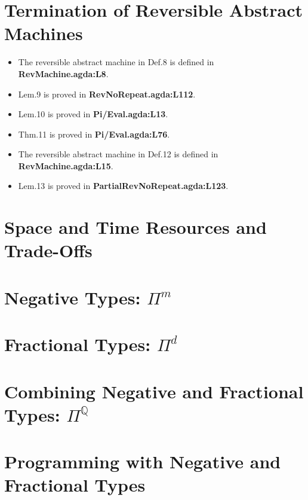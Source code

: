 \documentclass[12pt]{article}
\begin{document}
\section{Termination of Reversible Abstract Machines}
\begin{itemize}
\item The reversible abstract machine in Def.8 is defined in \textbf{RevMachine.agda:L8}.
\item Lem.9 is proved in \textbf{RevNoRepeat.agda:L112}.
\item Lem.10 is proved in \textbf{Pi/Eval.agda:L13}.
\item Thm.11 is proved in \textbf{Pi/Eval.agda:L76}.
\item The reversible abstract machine in Def.12 is defined in \textbf{RevMachine.agda:L15}.
\item Lem.13 is proved in \textbf{PartialRevNoRepeat.agda:L123}.
\end{itemize}

\section{Space and Time Resources and Trade-Offs}

\section{Negative Types: $\Pi^m$}

\section{Fractional Types: $\Pi^d$}

\section{Combining Negative and Fractional Types: $\Pi^{\mathbb{Q}}$}

\section{Programming with Negative and Fractional Types}
\end{document}

